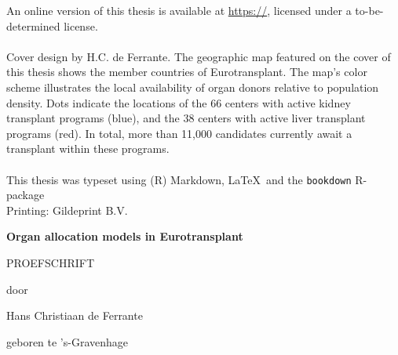 \documentclass[11pt,twoside,]{book}
\begin{document}
An online version of this thesis is available at \url{https://}, licensed under a to-be-determined license.
\\
\\
Cover design by H.C. de Ferrante. The geographic map featured on the cover of 
this thesis shows the member countries of Eurotransplant. The map's color 
scheme illustrates the local availability of organ donors relative to population
density. Dots indicate the locations of the 66 centers with active kidney transplant
programs (blue), and the 38 centers with active liver transplant programs (red). 
In total, more than 11,000 candidates currently await a transplant within these
programs.
\\
\\
This thesis was typeset using (R) Markdown, \LaTeX\ and the \verb+bookdown+ R-package
\\ Printing: Gildeprint B.V.



\endgroup

\clearpage
\thispagestyle{empty}
\vspace*{\drop}
\begin{center}
\Huge\textbf{Organ allocation models in Eurotransplant}\par
\vfill %
\large \textsc{PROEFSCHRIFT}\par
\vspace{\baselineskip}
\par %
\vspace{\baselineskip}
{\large door}\par
\vspace{\baselineskip}
{\Large Hans Christiaan de Ferrante}\par
\vspace{\baselineskip}
{\large geboren te 's-Gravenhage}
\end{center}
\end{document}
